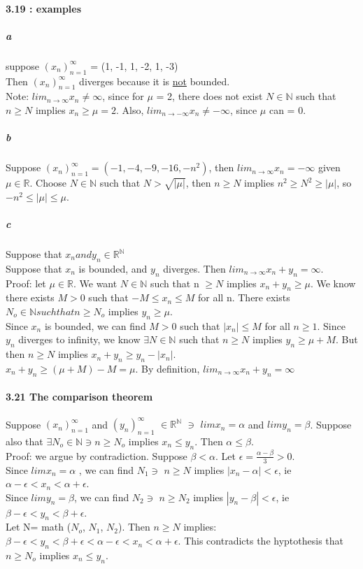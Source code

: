 \documentclass[10pt,letter]{article}
\begin{document}
\paragraph{3.19 : examples}
\subparagraph{a} suppose $(x_n)_{n=1}^\infty$ = (1, -1, 1, -2, 1, -3)\\ 
Then $(x_n)_{n=1}^\infty$ diverges because it is \underline{not} bounded. \\
Note: $lim_{n\rightarrow\infty} x_n \neq \infty$, since for $\mu$ = 2, there does not exist $N \in \mathbb{N}$ such that $n \geq N$ implies $x_n \geq \mu = 2$. Also, $lim_{n\rightarrow -\infty}x_n \neq -\infty$, since $\mu$ can = 0.\\
\subparagraph{b} Suppose $(x_n)_{n=1}^\infty = (-1, -4, -9, -16, -n^2)$, then $lim_{n\rightarrow\infty} x_n = -\infty$ given $\mu \in \mathbb{R}$. Choose $N \in \mathbb{N}$ such that $N > \sqrt{|\mu|}$, then $n \geq N$ implies $n^2 \geq N^2 \geq |\mu|$, so $-n^2 \leq |\mu| \leq \mu$.\\
\subparagraph{c} Suppose that $x_n and y_n \in \mathbb{R}^\mathbb{N}$\\ Suppose that $x_n$ is bounded, and  $y_n$ diverges. Then $lim_{n\rightarrow\infty} x_n + y_n = \infty$.\\ 
Proof: let $\mu \in \mathbb{R}$. We want $N \in \mathbb{N}$ such that n $\geq N$ implies $x_n + y_n \geq \mu$. We know there exists $M > 0$ such that $-M \leq x_n \leq M$ for all n. There exists $N_o \in \mathbb{N} such that n \geq N_o$ implies $y_n \geq \mu$. \\ 
Since $x_n$ is bounded, we can find $M>0$ such that $|x_n| \leq M$ for all $n \geq 1$. Since $y_n$ diverges to infinity, we know $\exists N \in \mathbb{N}$ such that $n \geq N$ implies $y_n \geq \mu + M$. But then $n \geq N$ implies $x_n + y_n \geq y_n - |x_n|$. \\ 
$x_n + y_n \geq (\mu + M) - M = \mu$. By definition, $lim_{n\rightarrow\infty} x_n + y_n = \infty$\\

\paragraph{3.21 The comparison theorem}
Suppose $(x_n)_{n=1}^\infty$ and $(y_n)_{n=1}^\infty$ $\in \mathbb{R}^\mathbb{N}$ $\ni$ $lim x_n = \alpha$ and $lim y_n = \beta$. Suppose also that $\exists N_o \in \mathbb{N} \ni n \geq N_o$ implies $x_n \leq y_n$. Then $\alpha \leq \beta$. \\ 
Proof: we argue by contradiction. Suppose $\beta < \alpha$. Let $\epsilon = \frac{\alpha - \beta}{3} > 0$.\\ 
Since $lim x_n = \alpha$ , we can find $N_1 \ni$ $n \geq N$  implies $|x_n - \alpha| < \epsilon$, ie $\alpha - \epsilon < x_n < \alpha + \epsilon$. \\
Since $lim y_n = \beta$, we can find $N_2 \ni$ $n \geq N_2$ implies $|y_n - \beta| < \epsilon$, ie $\beta - \epsilon < y_n < \beta + \epsilon$. \\
Let N= math ($N_o$, $N_1$, $N_2$). Then $n \geq N$ implies: $\beta - \epsilon < y_n < \beta + \epsilon < \alpha - \epsilon < x_n < \alpha + \epsilon$. This contradicts the hyptothesis that $n \geq N_o$ implies $x_n \leq y_n$. 
\end{document}
